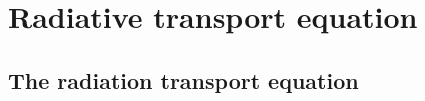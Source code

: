 \chapter{\label{ch:rte}Radiative transport equation}

\section{The radiation transport equation}



\endinput %
